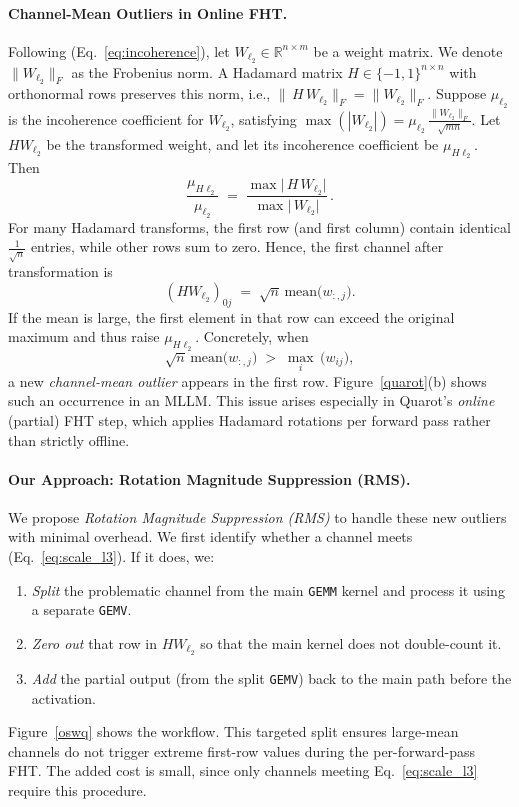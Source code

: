 \paragraph{Channel-Mean Outliers in Online FHT.}
Following (Eq.~\ref{eq:incoherence}), let \(W_{\ell_2}\in\mathbb{R}^{n\times m}\) be a weight matrix. We denote \(\|W_{\ell_2}\|_F\) as the Frobenius norm. A Hadamard matrix \(H \in \{-1,1\}^{n\times n}\) with orthonormal rows preserves this norm, i.e., \(\|\,H\,W_{\ell_2}\|_F = \|W_{\ell_2}\|_F\). Suppose \(\mu_{\ell_2}\) is the incoherence coefficient for \(W_{\ell_2}\), satisfying 
\(\max(|W_{\ell_2}|) = \mu_{\ell_2}\,\frac{\|W_{\ell_2}\|_F}{\sqrt{mn}}\).
Let \(HW_{\ell_2}\) be the transformed weight, and let its incoherence coefficient be \(\mu_{H\ell_2}\). Then
\begin{equation}\label{eq:scale_l2}
\frac{\mu_{H\ell_2}}{\mu_{\ell_2}}
\;=\;
\frac{\max\bigl|\,H\,W_{\ell_2}\bigr|}{\max\bigl|\,W_{\ell_2}\bigr|}
\,.
\end{equation}
For many Hadamard transforms, the first row (and first column) contain identical \(\tfrac{1}{\sqrt{n}}\) entries, while other rows sum to zero. Hence, the first channel after transformation is
\[
(H W_{\ell_2})_{0j}
\;=\;
\sqrt{n}\,\mathrm{mean}\bigl(w_{:,j}\bigr).
\]
If the mean is large, the first element in that row can exceed the original maximum and thus raise \(\mu_{H\ell_2}\). Concretely, when
\begin{equation}
\label{eq:scale_l3}
\sqrt{n}\,\mathrm{mean}\bigl(w_{:,j}\bigr) \;>\; \max_{i}\,\bigl(w_{ij}\bigr),
\end{equation}
a new \emph{channel-mean outlier} appears in the first row. Figure~\ref{quarot}(b) shows such an occurrence in an MLLM. This issue arises especially in Quarot’s \emph{online} (partial) FHT step, which applies Hadamard rotations per forward pass rather than strictly offline.

\paragraph{Our Approach: Rotation Magnitude Suppression (RMS).}
We propose \emph{Rotation Magnitude Suppression (RMS)} to handle these new outliers with minimal overhead. We first identify whether a channel meets (Eq.~\ref{eq:scale_l3}). If it does, we:
\begin{enumerate}[leftmargin=1.7em, itemsep=3pt]
    \item \emph{Split} the problematic channel from the main \texttt{GEMM} kernel and process it using a separate \texttt{GEMV}. 
    \item \emph{Zero out} that row in $HW_{\ell_2}$ so that the main kernel does not double-count it.
    \item \emph{Add} the partial output (from the split \texttt{GEMV}) back to the main path before the activation.
\end{enumerate}
Figure~\ref{oswq} shows the workflow. This targeted split ensures large-mean channels do not trigger extreme first-row values during the per-forward-pass FHT. The added cost is small, since only channels meeting Eq.~\ref{eq:scale_l3} require this procedure.

